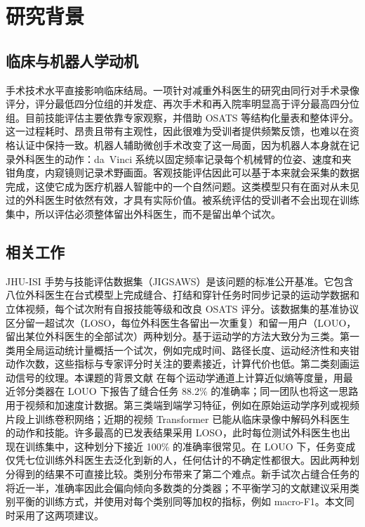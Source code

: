 \section{研究背景}

\subsection{临床与机器人学动机}

手术技术水平直接影响临床结局。一项针对减重外科医生的研究由同行对手术录像评分，评分最低四分位组的并发症、再次手术和再入院率明显高于评分最高四分位组\citep{birkmeyer2013skill}。目前技能评估主要依靠专家观察，并借助 OSATS 等结构化量表和整体评分\citep{martin1997osats}。这一过程耗时、昂贵且带有主观性，因此很难为受训者提供频繁反馈，也难以在资格认证中保持一致\citep{reiley2011review}。机器人辅助微创手术改变了这一局面，因为机器人本身就在记录外科医生的动作：da~Vinci 系统以固定频率记录每个机械臂的位姿、速度和夹钳角度，内窥镜则记录术野画面。客观技能评估因此可以基于本来就会采集的数据完成，这使它成为医疗机器人智能中的一个自然问题。这类模型只有在面对从未见过的外科医生时依然有效，才具有实际价值。被系统评估的受训者不会出现在训练集中，所以评估必须整体留出外科医生，而不是留出单个试次。

\subsection{相关工作}

JHU-ISI 手势与技能评估数据集（JIGSAWS）是该问题的标准公开基准\citep{gao2014jigsaws}。它包含八位外科医生在台式模型上完成缝合、打结和穿针任务时同步记录的运动学数据和立体视频，每个试次附有自报技能等级和改良 OSATS 评分。该数据集的基准协议区分留一超试次（LOSO，每位外科医生各留出一次重复）和留一用户（LOUO，留出某位外科医生的全部试次）两种划分\citep{ahmidi2017benchmarks}。基于运动学的方法大致分为三类。第一类用全局运动统计量概括一个试次，例如完成时间、路径长度、运动经济性和夹钳动作次数，这些指标与专家评分时关注的要素接近，计算代价也低\citep{reiley2011review, lefor2020motion, anh2020features}。第二类刻画运动信号的纹理。本课题的背景文献 \citet{zia2018rmis} 在每个运动学通道上计算近似熵\citep{pincus1991apen}等度量，用最近邻分类器在 LOUO 下报告了缝合任务 88.2\% 的准确率；同一团队也将这一思路用于视频和加速度计数据\citep{zia2018video}。第三类端到端学习特征，例如在原始运动学序列\citep{fawaz2018cnn, wang2018cnn}或视频片段\citep{funke2019video, liu2021unified}上训练卷积网络；近期的视频 Transformer 已能从临床录像中解码外科医生的动作和技能\citep{kiyasseh2023vit, lavanchy2021threestage}。许多最高的已发表结果采用 LOSO，此时每位测试外科医生也出现在训练集中，这种划分下接近 100\% 的准确率很常见\citep{fawaz2018cnn, funke2019video}。在 LOUO 下，任务变成仅凭七位训练外科医生去泛化到新的人，任何估计的不确定性都很大\citep{varoquaux2018cv}。因此两种划分得到的结果不可直接比较。类别分布带来了第二个难点。新手试次占缝合任务的将近一半，准确率因此会偏向倾向多数类的分类器；不平衡学习的文献建议采用类别平衡的训练方式，并使用对每个类别同等加权的指标，例如 macro-F1\citep{he2009imbalanced}。本文同时采用了这两项建议。

